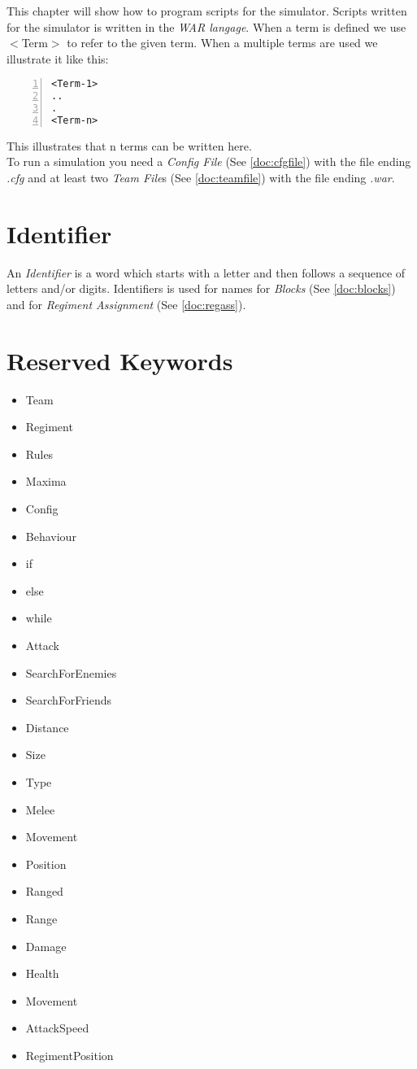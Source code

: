This chapter will show how to program scripts for the simulator. Scripts written for the simulator is written in the {\it WAR langage}. 
When a term is defined we use $<$Term$>$ to refer to the given term. 
When a multiple terms are used we illustrate it like this: \\

\begin{lstlisting}[basicstyle=\small\sffamily,
keywordstyle={\color{blue}},
comment={[l]{//}}, morecomment={[s]{/*}{*/}}, commentstyle=\itshape,
columns={[l]flexible}, numbers=left, numberstyle=\tiny,
frameround=fftt, frame=shadowbox, captionpos=b,
caption={Regiment Assignment}]
<Term-1>
..
.
<Term-n>
\end{lstlisting}
This illustrates that n terms can be written here. \\

To run a simulation you need a {\it Config File} (See \ref{doc:cfgfile}) with the file ending {\it .cfg} and at least two {\it Team File}s 
(See \ref{doc:teamfile}) with the file ending {\it .war}.

\section{Identifier}
	An {\it Identifier} is a word which starts with a letter and then follows a sequence of letters and/or digits.
	Identifiers is used for names for {\it Blocks} (See \ref{doc:blocks}) and for {\it Regiment Assignment} (See \ref{doc:regass}).
\section{Reserved Keywords}
	\begin{itemize}
		\item Team
		\item Regiment
		\item Rules
		\item Maxima
		\item Config
		\item Behaviour
		\item if
		\item else
		\item while
		\item Attack
		\item SearchForEnemies
		\item SearchForFriends
		\item Distance
		\item Size
		\item Type 
		\item Melee
		\item Movement
		\item Position
		\item Ranged
		\item Range
		\item Damage
		\item Health
		\item Movement
		\item AttackSpeed
		\item RegimentPosition
	\end{itemize}
